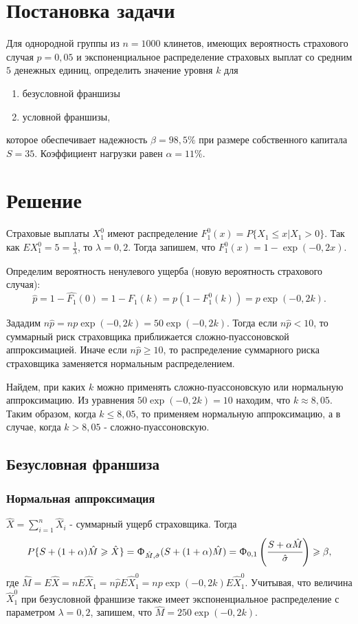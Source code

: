 \documentclass[a4paper,12pt]{article}
\begin{document}

\tableofcontents
\pagebreak

\section{Постановка задачи}
Для однородной группы из $n = 1000$ клинетов, имеющих вероятность страхового случая $p = 0,05$ и экспоненциальное распределение страховых выплат со средним $5$ денежных единиц, определить значение уровня $k$ для 
\begin{enumerate}
	\item безусловной франшизы
	\item условной франшизы,
\end{enumerate}
которое обеспечивает надежность $\beta = 98,5\%$ при размере собственного капитала $S = 35$. Коэффициент нагрузки равен $\alpha = 11\%$.

\section{Решение}

Страховые выплаты $X_1^0$ имеют распределение $F_1^0(x) = P\{X_1 \le x | X_1 > 0\}$. Так как $EX_1^0 = 5 = \frac{1}{\lambda}$, то $\lambda = 0,2$. Тогда запишем, что $F_1^0(x) = 1 - \exp(-0,2 x)$.

Определим вероятность ненулевого ущерба (новую вероятность страхового случая):
\[\hat{p} = 1 - \hat{F_1}(0) = 1 - F_1(k) = p (1 - F_1^0(k)) = p \exp(-0,2 k).\]

Зададим $n\hat{p} = np\exp(-0,2k) = 50 \exp (-0,2 k)$. Тогда если $n\hat{p} < 10$, то суммарный риск страховщика приближается сложно-пуассоновской аппроксимацией. Иначе если $n\hat{p} \ge 10$, то распределение суммарного риска страховщика заменяется нормальным распределением.

Найдем, при каких $k$ можно применять сложно-пуассоновскую или нормальную аппроксимацию. Из уравнения $50 \exp (-0,2 k) = 10$ находим, что $k \approx 8,05$. Таким образом, когда $k \le 8,05$, то применяем нормальную аппроксимацию, а в случае, когда $k > 8,05$ - сложно-пуассоновскую.

\subsection{Безусловная франшиза}

\subsubsection{Нормальная аппроксимация}
$\hat{X} = \sum_{i=1}^{n} \hat{X}_i$ - суммарный ущерб страховщика. Тогда \[P\{S + (1 + \alpha)\hat{M} \ge \hat{X}\} = \Upphi_{\hat{M}, \hat{\sigma}}(S + (1 + \alpha)\hat{M}) = \Upphi_{0, 1}\left(\cfrac{S + \alpha\hat{M}}{\hat{\sigma}}\right) \ge \beta,\]
где $\hat{M} = E\hat{X} = nE\hat{X}_1 = n\hat{p}E\hat{X}_1^0 = np\exp(-0,2k)E\hat{X}_1^0$. Учитывая, что величина $\hat{X}_1^0$ при безусловной франшизе также имеет экспоненциальное распределение с параметром $\lambda = 0,2$, запишем, что $\hat{M} = 250\exp(-0,2k)$.
 
\end{document}
